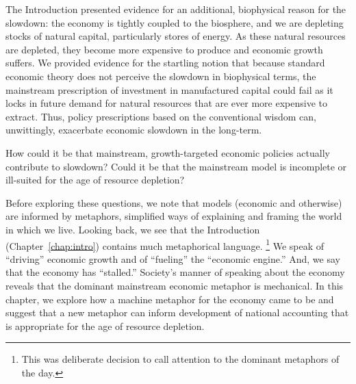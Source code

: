 The Introduction
presented evidence for an additional, 
biophysical reason for the slowdown:
the economy is tightly coupled to the biosphere,
and we are depleting stocks of natural capital,
particularly stores of energy.
As these natural resources are depleted,
they become more expensive to produce and
economic growth suffers.
We provided evidence
for the startling notion that because standard economic theory 
does not perceive the slowdown in biophysical terms, 
the mainstream prescription of 
investment in manufactured capital could fail
as it locks in future demand for natural resources 
that are ever more expensive to extract.
Thus, policy prescriptions based on the conventional wisdom can, 
unwittingly, exacerbate economic slowdown in the long-term.

How could it be that mainstream, growth-targeted
economic policies actually contribute to slowdown?
Could it be that the mainstream model is incomplete 
or ill-suited for the age of resource depletion?

Before exploring these questions, we note that 
models (economic and otherwise) are informed by metaphors,
simplified ways of explaining and framing the world in which we live.
Looking back, we see that the Introduction (Chapter~\ref{chap:intro})
contains much metaphorical language.%
	\footnote{
	This was deliberate decision to call attention 
	to the dominant metaphors of the day.
	}
We speak of 
``driving'' economic growth
and of ``fueling'' the ``economic engine.''
And, we say that the economy has ``stalled.''
Society's manner of speaking about the economy 
reveals that the dominant mainstream economic metaphor 
is mechanical.
In this chapter, we explore how a machine metaphor for the economy
came to be and suggest that a new metaphor 
can inform development of national accounting 
that is appropriate for the age of resource depletion.



